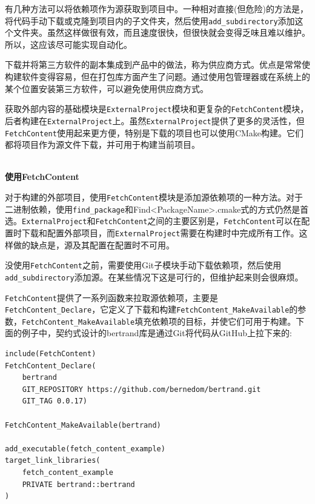 

有几种方法可以将依赖项作为源获取到项目中。一种相对直接(但危险)的方法是，将代码手动下载或克隆到项目内的子文件夹，然后使用\texttt{add\_subdirectory}添加这个文件夹。虽然这样做很有效，而且速度很快，但很快就会变得乏味且难以维护。所以，这应该尽可能实现自动化。

\begin{tcolorbox}[colback=webgreen!5!white,colframe=webgreen!75!black,title=Note]
下载并将第三方软件的副本集成到产品中的做法，称为供应商方式。优点是常常使构建软件变得容易，但在打包库方面产生了问题。通过使用包管理器或在系统上的某个位置安装第三方软件，可以避免使用供应商方式。
\end{tcolorbox}


获取外部内容的基础模块是\texttt{ExternalProject}模块和更复杂的\texttt{FetchContent}模块，后者构建在\texttt{ExternalProject}上。虽然\texttt{ExternalProject}提供了更多的灵活性，但\texttt{FetchContent}使用起来更方便，特别是下载的项目也可以使用CMake构建。它们都将项目作为源文件下载，并可用于构建当前项目。

\hspace*{\fill} \\ %
\noindent
\textbf{使用FetchContent}

对于构建的外部项目，使用\texttt{FetchContent}模块是添加源依赖项的一种方法。对于二进制依赖，使用\texttt{find\_package}和Find<PackageName>.cmake式的方式仍然是首选。\texttt{ExternalProject}和\texttt{FetchContent}之间的主要区别是，\texttt{FetchContent}可以在配置时下载和配置外部项目，而\texttt{ExternalProject}需要在构建时中完成所有工作。这样做的缺点是，源及其配置在配置时不可用。

没使用\texttt{FetchContent}之前，需要使用Git子模块手动下载依赖项，然后使用\texttt{add\_subdirectory}添加源。在某些情况下这是可行的，但维护起来则会很麻烦。

\texttt{FetchContent}提供了一系列函数来拉取源依赖项，主要是\texttt{FetchContent\_Declare}，它定义了下载和构建\texttt{FetchContent\_MakeAvailable}的参数，\texttt{FetchContent\_MakeAvailable}填充依赖项的目标，并使它们可用于构建。下面的例子中，契约式设计的bertrand库是通过Git将代码从GitHub上拉下来的:

\begin{lstlisting}[style=styleCMake]
include(FetchContent)
FetchContent_Declare(
	bertrand
	GIT_REPOSITORY https://github.com/bernedom/bertrand.git
	GIT_TAG 0.0.17)

FetchContent_MakeAvailable(bertrand)

add_executable(fetch_content_example)
target_link_libraries(
	fetch_content_example
	PRIVATE bertrand::bertrand
)
\end{lstlisting}


